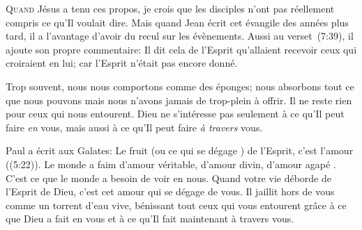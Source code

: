 



\lettrine{Q}{uand} Jésus a tenu ces propos,
 je crois que les disciples n'ont pas réellement compris
 ce qu'Il voulait dire. Mais quand Jean écrit cet évangile 
 des années plus tard, il a l'avantage d'avoir du recul sur les évènements.
 Aussi au verset~(7:39), il ajoute son propre commentaire:
 \Og Il dit cela de l'Esprit qu'allaient recevoir ceux qui croiraient en lui;
 car l'Esprit n'était pas encore donné. \Fg{}


Trop souvent, nous nous comportons comme des éponges;
 nous absorbons tout ce que nous pouvons mais nous n'avons jamais
 de trop-plein à offrir. Il ne reste rien pour ceux qui nous entourent.
 Dieu ne s'intéresse pas seulement à ce qu'Il peut faire \emph{en} vous,
 mais aussi à ce qu'Il peut faire \emph{à travers} vous.

Paul a écrit aux Galates: 
 \Og Le fruit (ou \Og ce qui se dégage \Fg{}) de l'Esprit,
 c'est l'amour \Fg{} ((5:22)).
 Le monde a faim d'amour véritable, d'amour divin, d'amour \Og agapé \Fg{}.
 C'est ce que le monde a besoin de voir en nous. Quand votre vie déborde
 de l'Esprit de Dieu, c'est cet amour qui se dégage de vous.
 Il jaillit hors de vous comme un torrent d'eau vive,
 bénissant tout ceux qui vous entourent grâce à ce que Dieu
 a fait en vous et à ce qu'Il fait maintenant à travers vous.

\dvrule





